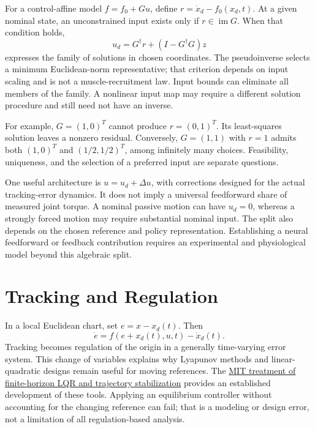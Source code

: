 \documentclass[12pt, openany]{book}
\theoremstyle{plain}
\begin{document}
For a control-affine model $f=f_0+Gu$, define
$r=\dot x_d-f_0(x_d,t)$. At a given nominal state, an unconstrained input exists
only if $r\in\operatorname{im}G$. When that condition holds,
\begin{equation}
 u_d=G^\dagger r+(I-G^\dagger G)z
 \label{eq:motion_feedforward_family}
\end{equation}
expresses the family of solutions in chosen coordinates. The pseudoinverse
selects a minimum Euclidean-norm representative; that criterion depends on
input scaling and is not a muscle-recruitment law. Input bounds can eliminate
all members of the family. A nonlinear input map may require a different
solution procedure and still need not have an inverse.

For example, $G=(1,0)^T$ cannot produce $r=(0,1)^T$. Its least-squares solution
leaves a nonzero residual. Conversely, $G=(1,1)$ with $r=1$ admits both
$(1,0)^T$ and $(1/2,1/2)^T$, among infinitely many choices. Feasibility,
uniqueness, and the selection of a preferred input are separate questions.

One useful architecture is $u=u_d+\Delta u$, with corrections designed for the
actual tracking-error dynamics. It does not imply a universal feedforward share
of measured joint torque. A nominal passive motion can have $u_d=0$, whereas
a strongly forced motion may require substantial nominal input. The split also
depends on the chosen reference and policy representation. Establishing a neural
feedforward or feedback contribution requires an experimental and physiological
model beyond this algebraic split.

\section{Tracking and Regulation}

In a local Euclidean chart, set $e=x-x_d(t)$. Then
\begin{equation}
 \dot e=f(e+x_d(t),u,t)-\dot x_d(t).
 \label{eq:motion_error_dynamics}
\end{equation}
Tracking becomes regulation of the origin in a generally time-varying error
system. This change of variables explains why Lyapunov methods and
linear-quadratic designs remain useful for moving references. The
\href{https://underactuated.mit.edu/lqr.html}{MIT treatment of finite-horizon LQR and trajectory stabilization}
provides an established development of these tools. Applying an equilibrium
controller without accounting for the changing reference can fail; that is a
modeling or design error, not a limitation of all regulation-based analysis.
\end{document}

